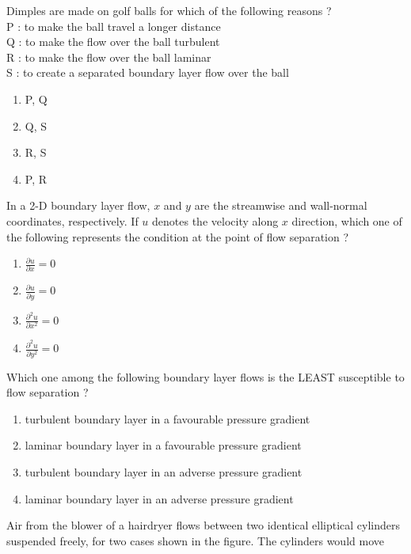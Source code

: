 \item Dimples are made on golf balls for which of the following reasons ? \\
P : to make the ball travel a longer distance \\
Q : to make the flow over the ball turbulent \\
R : to make the flow over the ball laminar \\
S : to create a separated boundary layer flow over the ball
\begin{enumerate}
    \item P, Q
    \item Q, S
    \item R, S
    \item P, R \\
\end{enumerate}
\item In a 2-D boundary layer flow, $x$ and $y$ are the streamwise and wall-normal coordinates, respectively. If $u$ denotes the velocity along $x$ direction, which one of the following represents the condition at the point of flow separation ?
\begin{enumerate}
    \item $\frac{\partial u}{\partial x} = 0$
    \item $\frac{\partial u}{\partial y} = 0$
    \item $\frac{\partial^2 u}{\partial x^2} = 0$
    \item $\frac{\partial^2 u}{\partial y^2} = 0$ \\
\end{enumerate}
\item Which one among the following boundary layer flows is the LEAST susceptible to flow separation ?
\begin{enumerate}
    \item turbulent boundary layer in a favourable pressure gradient
    \item laminar boundary layer in a favourable pressure gradient
    \item turbulent boundary layer in an adverse pressure gradient
    \item laminar boundary layer in an adverse pressure gradient \\
\end{enumerate}
\item Air from the blower of a hairdryer flows between two identical elliptical cylinders suspended freely, for two cases shown in the figure. The cylinders would move 
\begin{figure}[!ht]
\centering
\resizebox{0.5\textwidth}{!}{%

}%
\end{figure}
